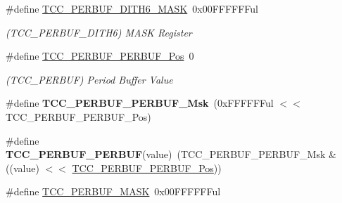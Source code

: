 \begin{DoxyCompactItemize}
\item 
\hypertarget{group___s_a_m_l21___t_c_c_gaadf4f6e51bfb7aef8f72546d05e37a78}{}\#define \hyperlink{group___s_a_m_l21___t_c_c_gaadf4f6e51bfb7aef8f72546d05e37a78}{T\+C\+C\+\_\+\+P\+E\+R\+B\+U\+F\+\_\+\+D\+I\+T\+H6\+\_\+\+M\+A\+S\+K}~0x00\+F\+F\+F\+F\+F\+Ful\label{group___s_a_m_l21___t_c_c_gaadf4f6e51bfb7aef8f72546d05e37a78}

\begin{DoxyCompactList}\small\item\em (T\+C\+C\+\_\+\+P\+E\+R\+B\+U\+F\+\_\+\+D\+I\+T\+H6) M\+A\+S\+K Register \end{DoxyCompactList}\item 
\hypertarget{group___s_a_m_l21___t_c_c_ga207ce806dad1b2f43f87665b17d38861}{}\#define \hyperlink{group___s_a_m_l21___t_c_c_ga207ce806dad1b2f43f87665b17d38861}{T\+C\+C\+\_\+\+P\+E\+R\+B\+U\+F\+\_\+\+P\+E\+R\+B\+U\+F\+\_\+\+Pos}~0\label{group___s_a_m_l21___t_c_c_ga207ce806dad1b2f43f87665b17d38861}

\begin{DoxyCompactList}\small\item\em (T\+C\+C\+\_\+\+P\+E\+R\+B\+U\+F) Period Buffer Value \end{DoxyCompactList}\item 
\hypertarget{group___s_a_m_l21___t_c_c_ga3b3ef32add7d1c403ac613df82962451}{}\#define {\bfseries T\+C\+C\+\_\+\+P\+E\+R\+B\+U\+F\+\_\+\+P\+E\+R\+B\+U\+F\+\_\+\+Msk}~(0x\+F\+F\+F\+F\+F\+Ful $<$$<$ T\+C\+C\+\_\+\+P\+E\+R\+B\+U\+F\+\_\+\+P\+E\+R\+B\+U\+F\+\_\+\+Pos)\label{group___s_a_m_l21___t_c_c_ga3b3ef32add7d1c403ac613df82962451}

\item 
\hypertarget{group___s_a_m_l21___t_c_c_gaaf3f277acf57f0c182aff3d4feb35f56}{}\#define {\bfseries T\+C\+C\+\_\+\+P\+E\+R\+B\+U\+F\+\_\+\+P\+E\+R\+B\+U\+F}(value)~(T\+C\+C\+\_\+\+P\+E\+R\+B\+U\+F\+\_\+\+P\+E\+R\+B\+U\+F\+\_\+\+Msk \& ((value) $<$$<$ \hyperlink{group___s_a_m_l21___t_c_c_ga207ce806dad1b2f43f87665b17d38861}{T\+C\+C\+\_\+\+P\+E\+R\+B\+U\+F\+\_\+\+P\+E\+R\+B\+U\+F\+\_\+\+Pos}))\label{group___s_a_m_l21___t_c_c_gaaf3f277acf57f0c182aff3d4feb35f56}

\item 
\hypertarget{group___s_a_m_l21___t_c_c_ga0f026409c729b51fd914c1ca5cee51fc}{}\#define \hyperlink{group___s_a_m_l21___t_c_c_ga0f026409c729b51fd914c1ca5cee51fc}{T\+C\+C\+\_\+\+P\+E\+R\+B\+U\+F\+\_\+\+M\+A\+S\+K}~0x00\+F\+F\+F\+F\+F\+Ful\label{group___s_a_m_l21___t_c_c_ga0f026409c729b51fd914c1ca5cee51fc}


\end{DoxyCompactItemize}
